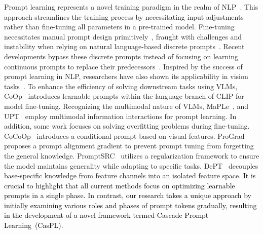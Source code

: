 \documentclass[runningheads]{llncs}
\newcommand{\implus}[1]{\textcolor{black}{#1}}
\begin{document}
Prompt learning represents a novel training paradigm in the realm of NLP~\cite{liu2023pre}. This approach streamlines the training process by necessitating input adjustments rather than fine-tuning all parameters in a pre-trained model. Fine-tuning necessitates manual prompt design primitively~\cite{brown2020language, schick2020few, gao2020making}, fraught with challenges and instability when relying on natural language-based discrete prompts~\cite{zhao2021calibrate, lester2021power}. 
Recent developments bypass these discrete prompts instead of focusing on learning continuous prompts to replace their predecessors~\cite{li2021prefix}. Inspired by the success of prompt learning in NLP, researchers have also shown its applicability in vision tasks~\cite{jia2022visual, wang2022learning}.
To enhance the efficiency of solving downstream tasks using VLMs, CoOp~\cite{zhou2022learning} introduces learnable prompts within the language branch of CLIP for model fine-tuning. Recognizing the multimodal nature of VLMs, MaPLe~\cite{khattak2023maple}, and UPT~\cite{zang2022unified} employ multimodal information interactions for prompt learning. In addition, some work focuses on solving overfitting problems during fine-tuning. CoCoOp~\cite{zhou2022conditional} introduces a conditional prompt based on visual features. ProGrad~\cite{zhu2023prompt} proposes a prompt alignment gradient to prevent prompt tuning from forgetting the general knowledge. PromptSRC~\cite{khattak2023self} utilizes a regularization framework to ensure the model maintains generality while adapting to specific tasks. DePT~\cite{zhang2023dept} decouples base-specific knowledge from feature channels into an isolated feature space. \implus{It is crucial to highlight that all current methods focus on optimizing learnable prompts in a single phase. In contrast, our research takes a unique approach by initially examining various roles and phases of prompt tokens gradually, resulting in the development of a novel framework termed Cascade Prompt Learning~(CasPL).}
\end{document}
